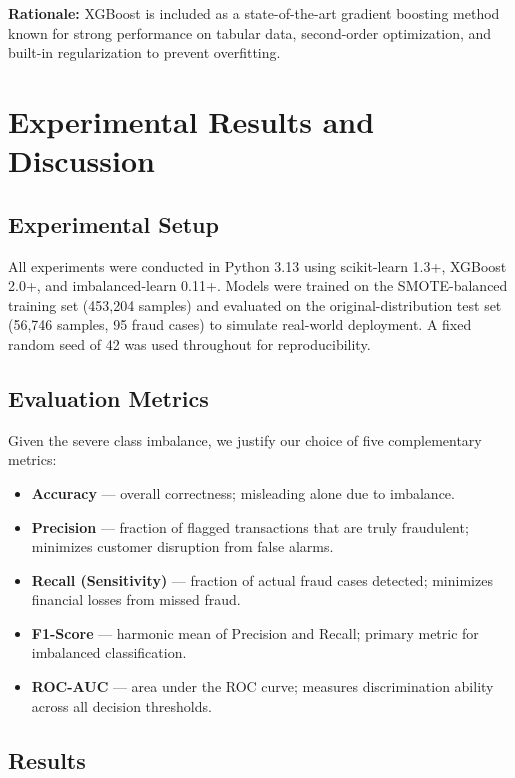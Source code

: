 \documentclass[conference]{IEEEtran}
\begin{document}
\textbf{Rationale:} XGBoost is included as a state-of-the-art gradient boosting method known for strong performance on tabular data, second-order optimization, and built-in regularization to prevent overfitting.

\section{Experimental Results and Discussion}
\label{sec:results}

\subsection{Experimental Setup}

All experiments were conducted in Python 3.13 using scikit-learn 1.3+, XGBoost 2.0+, and imbalanced-learn 0.11+. Models were trained on the SMOTE-balanced training set (453,204 samples) and evaluated on the original-distribution test set (56,746 samples, 95 fraud cases) to simulate real-world deployment. A fixed random seed of 42 was used throughout for reproducibility.

\subsection{Evaluation Metrics}

Given the severe class imbalance, we justify our choice of five complementary metrics:

\begin{itemize}
    \item \textbf{Accuracy} — overall correctness; misleading alone due to imbalance.
    \item \textbf{Precision} — fraction of flagged transactions that are truly fraudulent; minimizes customer disruption from false alarms.
    \item \textbf{Recall (Sensitivity)} — fraction of actual fraud cases detected; minimizes financial losses from missed fraud.
    \item \textbf{F1-Score} — harmonic mean of Precision and Recall; primary metric for imbalanced classification.
    \item \textbf{ROC-AUC} — area under the ROC curve; measures discrimination ability across all decision thresholds.
\end{itemize}

\subsection{Results}
\end{document}

